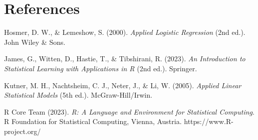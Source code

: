 \chapter*{References}

Hosmer, D. W., \& Lemeshow, S. (2000). \textit{Applied Logistic Regression} (2nd ed.). John Wiley \& Sons.

James, G., Witten, D., Hastie, T., \& Tibshirani, R. (2023). \textit{An Introduction to Statistical Learning with Applications in R} (2nd ed.). Springer.

Kutner, M. H., Nachtsheim, C. J., Neter, J., \& Li, W. (2005). \textit{Applied Linear Statistical Models} (5th ed.). McGraw-Hill/Irwin.

R Core Team (2023). \textit{R: A Language and Environment for Statistical Computing}. R Foundation for Statistical Computing, Vienna, Austria. https://www.R-project.org/